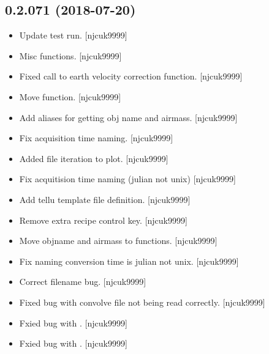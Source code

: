 \documentclass[a4paper,10pt,english]{report}
\begin{document}
\subsection{0.2.071 (2018-07-20)}
\label{\detokenize{misc/changelog:id386}}\begin{itemize}
\item {} 
Update test run. {[}njcuk9999{]}

\item {} 
Misc functions. {[}njcuk9999{]}

\item {} 
Fixed call to earth velocity correction function. {[}njcuk9999{]}

\item {} 
Move  function. {[}njcuk9999{]}

\item {} 
Add aliases for getting obj name and airmass. {[}njcuk9999{]}

\item {} 
Fix acquisition time naming. {[}njcuk9999{]}

\item {} 
Added file iteration to plot. {[}njcuk9999{]}

\item {} 
Fix acquitision time naming (julian not unix) {[}njcuk9999{]}

\item {} 
Add tellu template file definition. {[}njcuk9999{]}

\item {} 
Remove extra recipe control key. {[}njcuk9999{]}

\item {} 
Move objname and airmass to functions. {[}njcuk9999{]}

\item {} 
Fix naming conversion time is julian not unix. {[}njcuk9999{]}

\item {} 
Correct filename bug. {[}njcuk9999{]}

\item {} 
Fixed bug with convolve file not being read correctly. {[}njcuk9999{]}

\item {} 
Fxied bug with . {[}njcuk9999{]}

\item {} 
Fxied bug with . {[}njcuk9999{]}


\end{itemize}
\end{document}
